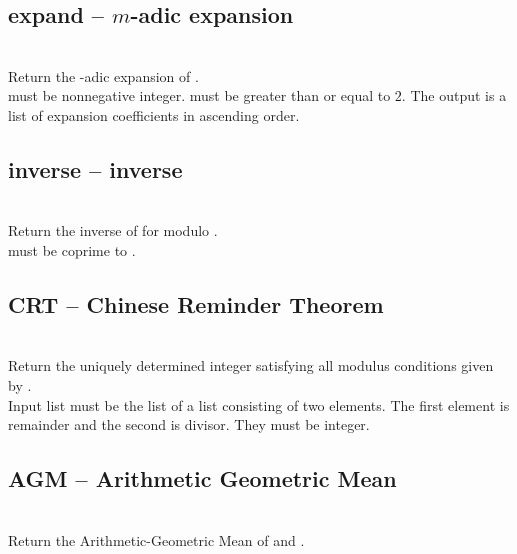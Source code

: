 \subsection{expand -- $m$-adic expansion}
\\
\spacing
\quad Return the -adic expansion of .\\ 
\spacing
\quad {} must be nonnegative integer.  must be greater than or equal to $2$.  The output is a list of expansion coefficients in ascending order.\\
%
\subsection{inverse -- inverse}
\\
\spacing
\quad Return the inverse of  for modulo .\\
\spacing
\quad {} must be coprime to .\\
%
\subsection{CRT -- Chinese Reminder Theorem}
\\
\spacing
\quad Return the uniquely determined integer satisfying all modulus
conditions given by .\\
\spacing
\quad Input list  must be the list of a list consisting of two elements.
The first element is remainder and the second is divisor.
They must be integer.\\
%
\subsection{AGM -- Arithmetic Geometric Mean}
\\
\spacing
\quad Return the Arithmetic-Geometric Mean of  and .\\
%
%
